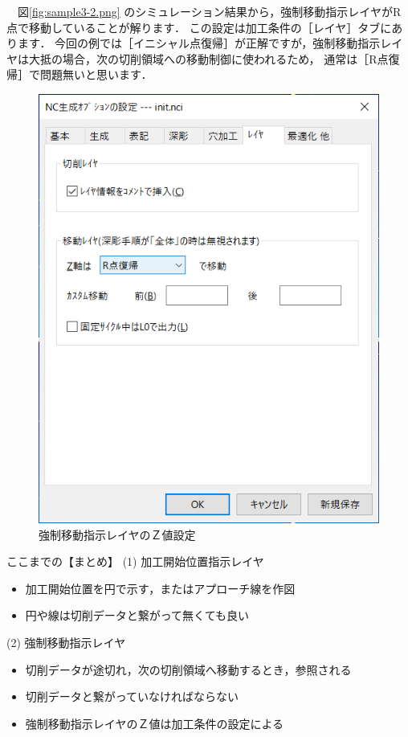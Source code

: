 \begin{minipage}[t]{0.5\textwidth}
　図\ref{fig:sample3-2.png} のシミュレーション結果から，強制移動指示レイヤがR点で移動していることが解ります．
この設定は加工条件の［レイヤ］タブにあります．
今回の例では［イニシャル点復帰］が正解ですが，強制移動指示レイヤは大抵の場合，次の切削領域への移動制御に使われるため，
通常は［R点復帰］で問題無いと思います．
\end{minipage}
\begin{minipage}[t]{0.5\textwidth}
\vspace*{-2zh}
\begin{figure}[H]
\centering
\includegraphics[scale=0.7]{No3/fig/move-setup.png}
\caption{強制移動指示レイヤのＺ値設定}
\label{fig:move-setup.png}
\end{figure}
\end{minipage}

\begin{itembox}[l]{ここまでの【まとめ】}
(1) 加工開始位置指示レイヤ
\begin{itemize}
\item 加工開始位置を円で示す，またはアプローチ線を作図
\item 円や線は切削データと繋がって無くても良い
\end{itemize}
(2) 強制移動指示レイヤ
\begin{itemize}
\item 切削データが途切れ，次の切削領域へ移動するとき，参照される
\item 切削データと繋がっていなければならない
\item 強制移動指示レイヤのＺ値は加工条件の設定による
\end{itemize}
\end{itembox}

